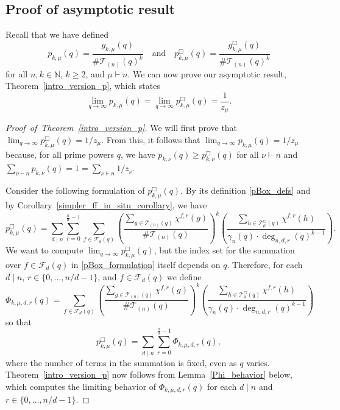 \documentclass[10pt]{article}
\theoremstyle{definition}
\newcommand{\CF}{\mathcal{F}}
\newcommand{\N}{\mathbb{N}}
\newcommand{\CT}{\mathcal{T}}
\begin{document}
\subsection{Proof of asymptotic result}

Recall that we have defined
\begin{equation}
p_{k,\mu} (q) = \frac{g_{k,\mu}(q)}{\# \CT_{(n)} (q)^k}
\quad \text{and} \quad
p_{k,\mu}^\Box (q) = \frac{g_{k,\mu}^\Box(q)}{\# \CT_{(n)} (q)^k}
\end{equation}
for all \(n,k \in \N\), \(k \geq 2\), and \(\mu \vdash n\).
We can now prove our asymptotic result, Theorem~\ref{intro_version_p}, which states
\begin{equation}
\lim_{q \to \infty}
p_{k,\mu} (q)
=
\lim_{q \to \infty}
p_{k,\mu}^\Box (q)
=
\frac{1}{z_\mu}.
\end{equation}


\begin{proof}[Proof~of~Theorem~\ref{intro_version_p}]
We will first prove that \(\lim_{q \to \infty} p_{k,\mu}^\Box (q) = 1 / z_\mu\).
From this, it follows that \(\lim_{q \to \infty} p_{k,\mu} (q) = 1 / z_\mu\) because, for all prime powers \(q\), we have \(p_{k,\nu} (q) \geq p_{k,\nu}^\Box (q)\) for all \(\nu \vdash n\) and \(\sum_{\nu \vdash n} p_{k,\nu} (q) = 1 = \sum_{\nu \vdash n} 1/z_\nu\).

Consider the following formulation of \(p_{k,\mu}^\Box (q)\).
By its definition \eqref{pBox_defs} and by Corollary~\ref{simpler_ff_in_situ_corollary}, we have
\begin{equation}
\label{pBox_formulation}
p_{k,\mu}^\Box (q) =
\sum_{d \mid n}
\sum_{r = 0}^{\tfrac{n}{d} - 1}
\sum_{f \in \CF_d (q)}
\left (
\frac{\sum_{g \in \CT_{(n)}(q)} \chi^{f,r}(g)}{\# \CT_{(n)}(q)}
\right )^k
\left (
\frac{\sum_{h \in \CT^\Box_\mu(q)} \chi^{f,r}(h)}{\gamma_n(q) \cdot \deg_{n,d,r}(q)^{k-1}}
\right ).
\end{equation}
We want to compute \(\lim_{q \to \infty} p_{k,\mu}^\Box (q)\), but the index set for the summation over \(f \in \CF_d (q)\) in \eqref{pBox_formulation} itself depends on \(q\).
Therefore, for each \(d \mid n\), \(r \in \{0,\ldots,n/d-1\}\), and \(f \in \CF_d (q)\) we define
\begin{equation}
\Phi_{k,\mu,d,r} (q)
=
\sum_{f \in \CF_d (q)}
\left (
\frac{\sum_{g \in \CT_{(n)}(q)} \chi^{f,r}(g)}{\# \CT_{(n)}(q)}
\right )^k
\left (
\frac{\sum_{h \in \CT^\Box_\mu(q)} \chi^{f,r}(h)}{\gamma_n(q) \cdot \deg_{n,d,r}(q)^{k-1}}
\right )
\end{equation}
so that
\begin{equation}
p^\Box_{k,\mu} (q)
=
\sum_{d \mid n}
\sum_{r = 0}^{\tfrac{n}{d}-1}
\Phi_{k,\mu,d,r} (q),
\end{equation}
where the number of terms in the summation is fixed, even as \(q\) varies.
Theorem~\ref{intro_version_p} now follows from Lemma~\ref{Phi_behavior} below, which computes the limiting behavior of \(\Phi_{k,\mu,d,r} (q)\) for each \(d \mid n\) and \(r \in \{0,\ldots,n/d-1\}\).
\end{proof}
\end{document}
